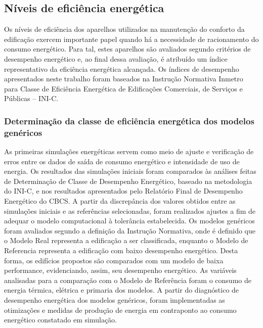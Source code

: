\subsection{Níveis de eficiência energética}
Os níveis de eficiência dos aparelhos utilizados na manutenção do conforto da edificação exercem importante papel quando há a necessidade de racionamento do consumo energético. Para tal, estes aparelhos são avaliados segundo critérios de desempenho energético e, ao final dessa avaliação, é atribuído um índice representativo da eficiência energética alcançada. Os índices de desempenho apresentados neste trabalho foram baseados na Instrução Normativa Inmetro para Classe de Eficiência Energética de Edificações Comerciais, de Serviços e Públicas – INI-C.

\subsubsection{Determinação da classe de eficiência energética dos modelos genéricos}
As primeiras simulações energéticas servem como meio de ajuste e verificação de erros entre os dados de saída de consumo energético e intensidade de uso de energia. Os resultados das simulações iniciais foram comparados às análises feitas de Determinação de Classe de Desempenho Energético, baseado na metodologia do INI-C, e nos resultados apresentados pelo Relatório Final de Desempenho Energético do CBCS. A partir da discrepância dos valores obtidos entre as simulações iniciais e as referências selecionadas, foram realizados ajustes a fim de adequar o modelo computacional à tolerância estabelecida.\vspace*{0.3cm} \newline
Os modelos genéricos foram avaliados segundo a definição da Instrução Normativa, onde é definido que o Modelo Real representa a edificação a ser classificada, enquanto o Modelo de Referencia representa a edificação com baixo desempenho energético. Desta forma, os edifícios propostos são comparados com um modelo de baixa performance, evidenciando, assim, seu desempenho energético. As variáveis analisadas para a comparação com o Modelo de Referência foram o consumo de energia térmica, elétrica e primaria dos modelos.\vspace*{0.3cm} \newline
A partir do diagnóstico de desempenho energética dos modelos genéricos, foram implementadas as otimizações e medidas de produção de energia em contraponto ao consumo energético constatado em simulação.

